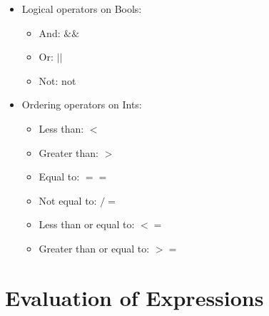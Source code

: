 \documentclass{article}
\begin{document}
\begin{itemize}
\item Logical operators on Bools:
\begin{itemize}
\item And: $\&\&$
\item Or: $||$
\item Not: not
\end{itemize}
\item Ordering operators on Ints:
\begin{itemize}
\item Less than: $<$
\item Greater than: $>$
\item Equal to: $==$
\item Not equal to: $/=$
\item Less than or equal to: $<=$
\item Greater than or equal to: $>=$
\end{itemize}
\end{itemize}

\section{Evaluation of Expressions}
\end{document}
